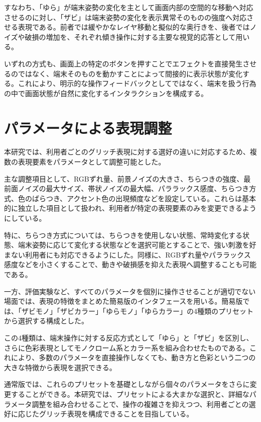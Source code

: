 すなわち、「ゆら」が端末姿勢の変化を主として画面内部の空間的な移動へ対応させるのに対し、「ザビ」は端末姿勢の変化を表示異常そのものの強度へ対応させる表現である。前者では緩やかなレイヤ移動と擬似的な奥行きを、後者ではノイズや破損の増加を、それぞれ傾き操作に対する主要な視覚的応答として用いる。

いずれの方式も、画面上の特定のボタンを押すことでエフェクトを直接発生させるのではなく、端末そのものを動かすことによって間接的に表示状態が変化する。これにより、明示的な操作フィードバックとしてではなく、端末を扱う行為の中で画面状態が自然に変化するインタラクションを構成する。


\section{パラメータによる表現調整}

本研究では、利用者ごとのグリッチ表現に対する選好の違いに対応するため、複数の表現要素をパラメータとして調整可能とした。

主な調整項目として、RGBずれ量、前景ノイズの大きさ、ちらつきの強度、最前面ノイズの最大サイズ、帯状ノイズの最大幅、パララックス感度、ちらつき方式、色のばらつき、アクセント色の出現頻度などを設定している。これらは基本的に独立した項目として扱われ、利用者が特定の表現要素のみを変更できるようにしている。

特に、ちらつき方式については、ちらつきを使用しない状態、常時変化する状態、端末姿勢に応じて変化する状態などを選択可能とすることで、強い刺激を好まない利用者にも対応できるようにした。同様に、RGBずれ量やパララックス感度などを小さくすることで、動きや破損感を抑えた表現へ調整することも可能である。

一方、評価実験など、すべてのパラメータを個別に操作させることが適切でない場面では、表現の特徴をまとめた簡易版のインタフェースを用いる。簡易版では、「ザビモノ」「ザビカラー」「ゆらモノ」「ゆらカラー」の4種類のプリセットから選択する構成とした。

この4種類は、端末操作に対する反応方式として「ゆら」と「ザビ」を区別し、さらに色彩表現としてモノクローム系とカラー系を組み合わせたものである。これにより、多数のパラメータを直接操作しなくても、動き方と色彩という二つの大きな特徴から表現を選択できる。

通常版では、これらのプリセットを基礎としながら個々のパラメータをさらに変更することができる。本研究では、プリセットによる大まかな選択と、詳細なパラメータ調整を組み合わせることで、操作の複雑さを抑えつつ、利用者ごとの選好に応じたグリッチ表現を構成できることを目指している。